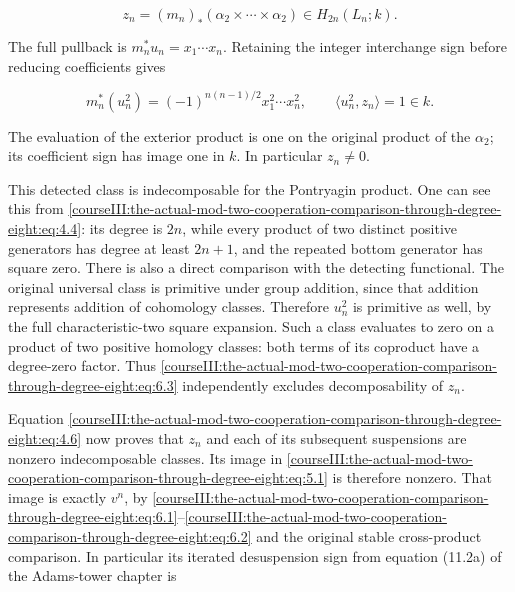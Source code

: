 \begin{equation}
z_n=(m_n)_*(\alpha_2\times\cdots\times\alpha_2)
 \in H_{2n}(L_n;k).
\label{courseIII:the-actual-mod-two-cooperation-comparison-through-degree-eight:eq:6.2}
\end{equation}

The full pullback is \(m_n^*u_n=x_1\cdots x_n\). Retaining the integer interchange sign before reducing coefficients gives

\begin{equation}
m_n^*(u_n^2)=(-1)^{n(n-1)/2}x_1^2\cdots x_n^2,
\qquad \langle u_n^2,z_n\rangle=1\in k.
\label{courseIII:the-actual-mod-two-cooperation-comparison-through-degree-eight:eq:6.3}
\end{equation}

The evaluation of the exterior product is one on the original product of the \(\alpha_2\); its coefficient sign has image one in \(k\). In particular \(z_n\neq0\).

This detected class is indecomposable for the Pontryagin product. One can see this from \eqref{courseIII:the-actual-mod-two-cooperation-comparison-through-degree-eight:eq:4.4}: its degree is \(2n\), while every product of two distinct positive generators has degree at least \(2n+1\), and the repeated bottom generator has square zero. There is also a direct comparison with the detecting functional. The original universal class is primitive under group addition, since that addition represents addition of cohomology classes. Therefore \(u_n^2\) is primitive as well, by the full characteristic-two square expansion. Such a class evaluates to zero on a product of two positive homology classes: both terms of its coproduct have a degree-zero factor. Thus \eqref{courseIII:the-actual-mod-two-cooperation-comparison-through-degree-eight:eq:6.3} independently excludes decomposability of \(z_n\).

Equation \eqref{courseIII:the-actual-mod-two-cooperation-comparison-through-degree-eight:eq:4.6} now proves that \(z_n\) and each of its subsequent suspensions are nonzero indecomposable classes. Its image in \eqref{courseIII:the-actual-mod-two-cooperation-comparison-through-degree-eight:eq:5.1} is therefore nonzero. That image is exactly \(v^n\), by \eqref{courseIII:the-actual-mod-two-cooperation-comparison-through-degree-eight:eq:6.1}--\eqref{courseIII:the-actual-mod-two-cooperation-comparison-through-degree-eight:eq:6.2} and the original stable cross-product comparison. In particular its iterated desuspension sign from equation (11.2a) of the Adams-tower chapter is

